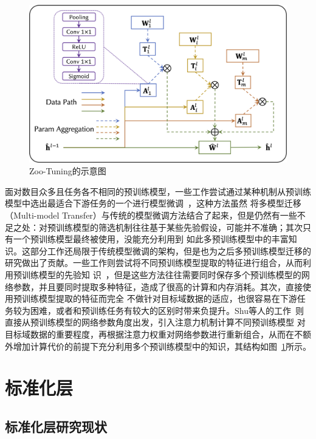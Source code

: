 \begin{figure}
    \centering
    \includegraphics[width=0.8\linewidth]{figures/zootuning.png}
    \caption{Zoo-Tuning的示意图~\citep{shu2021zoo}}
    \label{fig:zoo}
\end{figure}

面对数目众多且任务各不相同的预训练模型，一些工作尝试通过某种机制从预训练模型中选出最适合下游任务的一个进行模型微调~\citep{tran2019transferability,bao2019information,you2021logme}，这种方法虽然
将多模型迁移（Multi-model Transfer）与传统的模型微调方法结合了起来，但是仍然有一些不足之处：对预训练模型的筛选机制往往基于某些先验假设，可能并不准确；其次只有一个预训练模型最终被使用，没能充分利用到
如此多预训练模型中的丰富知识。这部分工作还局限于传统模型微调的架构，但是也为之后多预训练模型迁移的研究做出了贡献。一些工作则尝试将不同预训练模型提取的特征进行组合，从而利用预训练模型的先验知
识~\citep{rusu2016progressive,liu2019knowledge}，但是这些方法往往需要同时保存多个预训练模型的网络参数，并且要同时提取多种特征，造成了很高的计算和内存消耗。其次，直接使用预训练模型提取的特征而完全
不做针对目标域数据的适应，也很容易在下游任务较为困难，或者和预训练任务有较大的区别时带来负提升。Shu等人的工作~\citep{shu2021zoo}则直接从预训练模型的网络参数角度出发，引入注意力机制计算不同预训练模型
对目标域数据的重要程度，再根据注意力权重对网络参数进行重新组合，从而在不额外增加计算代价的前提下充分利用多个预训练模型中的知识，其结构如图~\ref{fig:zoo}所示。

\section{标准化层}

\subsection{标准化层研究现状}

